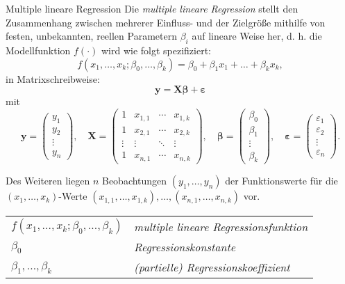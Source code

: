 \begin{defi}{Multiple lineare Regression}
    Die \emph{multiple lineare Regression} stellt den Zusammenhang zwischen mehrerer Einfluss- und der Zielgröße mithilfe von festen, unbekannten, reellen Parametern $\beta_{i}$ auf lineare Weise her, d. h. die Modellfunktion $f(\cdot)$ wird wie folgt spezifiziert:
    \[
        f(x_1, \ldots, x_k; \beta_0, \ldots, \beta_k) = \beta_0 + \beta_1 x_1 + \ldots + \beta_k x_k,
    \]
    in Matrixschreibweise:
    \[
        \mathbf{y} = \mathbf{X} \boldsymbol{\beta} + \boldsymbol{\varepsilon}
    \]
    mit
    \[
        \mathbf{y} = \begin{pmatrix}
            y_1 \\ y_2 \\ \vdots \\ y_n
        \end{pmatrix},
        \quad \mathbf{X} = \begin{pmatrix}
            1      & x_{1,1} & \cdots & x_{1,k} \\
            1      & x_{2,1} & \cdots & x_{2,k} \\
            \vdots & \vdots  & \ddots & \vdots  \\
            1      & x_{n,1} & \cdots & x_{n,k}
        \end{pmatrix},
        \quad \boldsymbol{\beta} = \begin{pmatrix}
            \beta_0 \\ \beta_1 \\ \vdots \\ \beta_k
        \end{pmatrix},
        \quad \boldsymbol{\varepsilon} = \begin{pmatrix}
            \varepsilon_1 \\ \varepsilon_2 \\ \vdots \\ \varepsilon_n
        \end{pmatrix}.
    \]

    Des Weiteren liegen $n$ Beobachtungen $(y_1, \ldots, y_n)$ der Funktionswerte für die  $(x_{1}, \ldots, x_{k})$-Werte $(x_{1,1}, \ldots, x_{1,k}), \ldots, (x_{n,1}, \ldots, x_{n,k})$ vor.

    \tcbline

    \begin{tabularx}{\linewidth}{lX}
        $f(x_1, \ldots, x_k; \beta_0, \ldots, \beta_k)$ & \emph{multiple lineare Regressionsfunktion} \\
        $\beta_0$                                       & \emph{Regressionskonstante}                 \\
        $\beta_1, \ldots, \beta_k$                      & \emph{(partielle) Regressionskoeffizient}
    \end{tabularx}
\end{defi}

